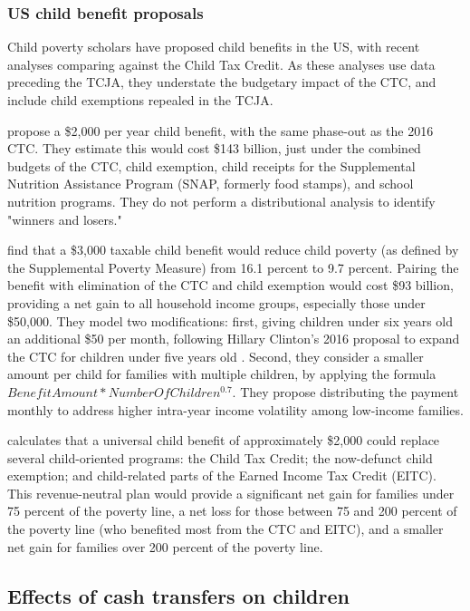 \documentclass[12pt]{article}
\begin{document}
\subsubsection{US child benefit proposals}

Child poverty scholars have proposed child benefits in the US, with recent analyses comparing against the Child Tax Credit. As these analyses use data preceding the TCJA, they understate the budgetary impact of the CTC, and include child exemptions repealed in the TCJA.

 propose a \$2,000 per year child benefit, with the same phase-out as the 2016 CTC. They estimate this would cost \$143 billion, just under the combined budgets of the CTC, child exemption, child receipts for the Supplemental Nutrition Assistance Program (SNAP, formerly food stamps), and school nutrition programs. They do not perform a distributional analysis to identify "winners and losers."

 find that a \$3,000 taxable child benefit would reduce child poverty (as defined by the Supplemental Poverty Measure) from 16.1 percent to 9.7 percent. Pairing the benefit with elimination of the CTC and child exemption would cost \$93 billion, providing a net gain to all household income groups, especially those under \$50,000. They model two modifications: first, giving children under six years old an additional \$50 per month, following Hillary Clinton's 2016 proposal to expand the CTC for children under five years old \cite{sawhill}. Second, they consider a smaller amount per child for families with multiple children, by applying the formula $BenefitAmount * NumberOfChildren^{0.7}$. They propose distributing the payment monthly to address higher intra-year income volatility among low-income families.

 calculates that a universal child benefit of approximately \$2,000 could replace several child-oriented programs: the Child Tax Credit; the now-defunct child exemption; and child-related parts of the Earned Income Tax Credit (EITC). This revenue-neutral plan would provide a significant net gain for families under 75 percent of the poverty line, a net loss for those between 75 and 200 percent of the poverty line (who benefited most from the CTC and EITC), and a smaller net gain for families over 200 percent of the poverty line.

\subsection{Effects of cash transfers on children}
\end{document}
